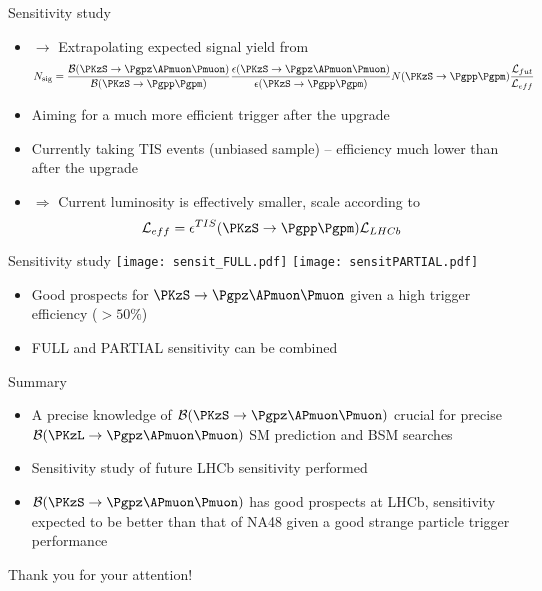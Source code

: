 \documentclass[9pt,hyperref={unicode},utf8]{beamer}
\newcommand{\KsPizMuMu}{\ensuremath{\PKzS\rightarrow \Pgpz\APmuon\Pmuon} }
\newcommand{\KsPipPim}{\ensuremath{\PKzS\rightarrow\Pgpp\Pgpm} }
\begin{document}
\begin{frame}{Sensitivity study}
 \begin{itemize}
   \setlength\itemsep{0.7em}
  \item[]$\rightarrow$ Extrapolating expected signal yield from
    \begin{equation*}
      N_{\rm sig} = \frac{{\cal B}(\KsPizMuMu)}{{\cal B}(\KsPipPim)}\frac{\epsilon(\KsPizMuMu)}{\epsilon(\KsPipPim)} N(\KsPipPim)\frac{{\cal L}_{fut}}{{\cal L}_{eff}}
    \end{equation*} 
   \item Aiming for a much more efficient trigger after the upgrade
   \item Currently taking TIS events (unbiased sample) -- efficiency much lower than after the upgrade
   \item[] $\Rightarrow$ Current luminosity is effectively smaller, scale according to
  \begin{equation*}
    {\cal L}_{eff} = \epsilon^{TIS}(\KsPipPim){\cal L}_{LHCb} 
  \end{equation*}
 \end{itemize}
\end{frame}

\begin{frame}{Sensitivity study}
  \centering
  \texttt{[image: sensit\_FULL.pdf]}
  \texttt{[image: sensitPARTIAL.pdf]}
  \begin{itemize}
      \item Good prospects for \KsPizMuMu given a high trigger efficiency ($>50\%$)
      \item FULL and PARTIAL sensitivity can be combined
  \end{itemize}
\end{frame}


\begin{frame}{Summary}
 \begin{itemize}
   \setlength\itemsep{0.7em}
  \item A precise knowledge of ${\cal B}(\KsPizMuMu)$ crucial for precise ${\cal B}(\PKzL\to\Pgpz\APmuon\Pmuon)$ SM prediction and BSM searches
  \item Sensitivity study of future LHCb sensitivity performed
  \item ${\cal B}(\KsPizMuMu)$ has good prospects at LHCb, sensitivity expected to be better than that of NA48 given a good strange particle trigger performance
 \end{itemize}
 
 \vspace{0.5cm}
 
 \centering
 \Huge{Thank you for your attention!}
\end{frame}
\end{document}
